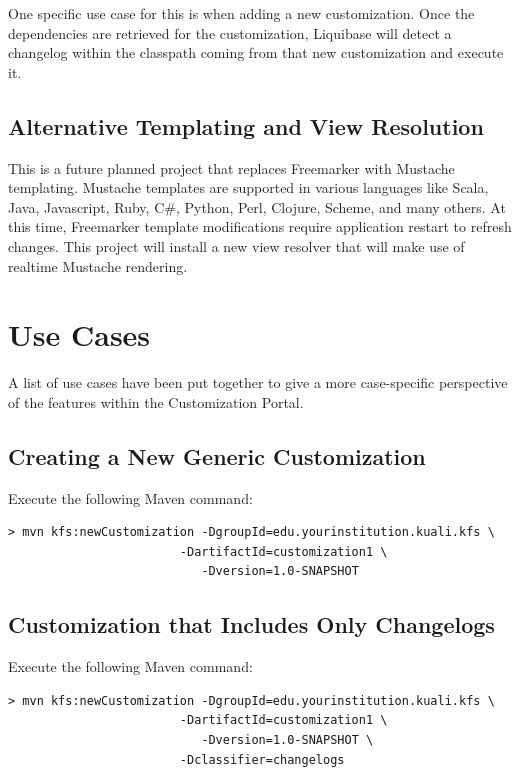\documentclass[12pt]{report}
\begin{document}
One specific use case for this is when adding a new customization. Once the dependencies are retrieved for the customization, Liquibase
will detect a changelog within the classpath coming from that new customization and execute it.

\subsection{Alternative Templating and View Resolution}

This is a future planned project that replaces Freemarker with Mustache templating. Mustache templates are supported in various
languages like Scala, Java, Javascript, Ruby, C\#, Python, Perl, Clojure, Scheme, and many others. At this time, Freemarker template 
modifications require application restart to refresh changes. This project will install a new view resolver that will make use of realtime
Mustache rendering.

\section{Use Cases}

A list of use cases have been put together to give a more case-specific perspective of the features within the Customization Portal.

\subsection{Creating a New Generic Customization}

Execute the following Maven command:

\begin{verbatim}
> mvn kfs:newCustomization -DgroupId=edu.yourinstitution.kuali.kfs \
                        -DartifactId=customization1 \
                           -Dversion=1.0-SNAPSHOT
\end{verbatim}

\subsection{Customization that Includes Only Changelogs}

Execute the following Maven command:

\begin{verbatim}
> mvn kfs:newCustomization -DgroupId=edu.yourinstitution.kuali.kfs \
                        -DartifactId=customization1 \
                           -Dversion=1.0-SNAPSHOT \
                        -Dclassifier=changelogs
\end{verbatim}
\end{document}

